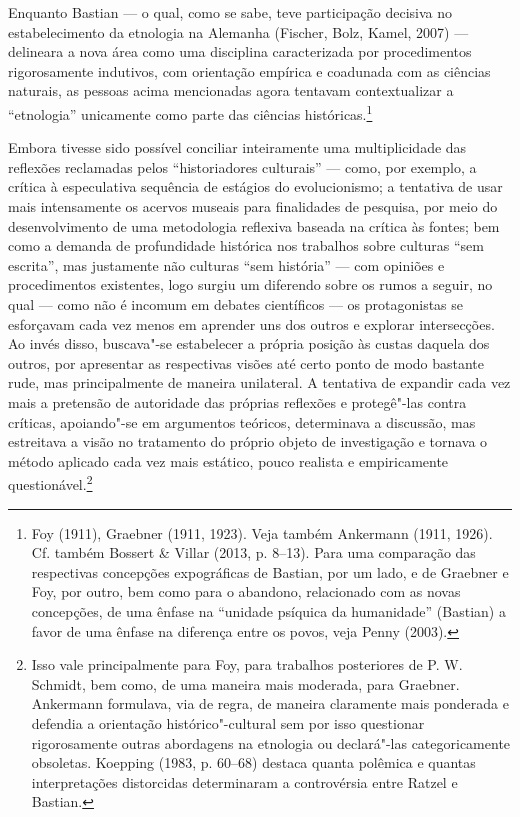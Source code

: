 Enquanto Bastian --- o qual, como se sabe, teve participação decisiva no
estabelecimento da etnologia na Alemanha (Fischer, Bolz, Kamel, 2007) ---
delineara a nova área como uma disciplina caracterizada por
procedimentos rigorosamente indutivos, com orientação empírica e
coadunada com as ciências naturais, as pessoas acima mencionadas agora
tentavam contextualizar a ``etnologia'' unicamente como parte das
ciências históricas.\footnote{Foy (1911), Graebner (1911, 1923). Veja
  também Ankermann (1911, 1926). Cf. também Bossert \& Villar (2013, p.
  8--13). Para uma comparação das respectivas concepções expográficas de
  Bastian, por um lado, e de Graebner e Foy, por outro, bem como para o
  abandono, relacionado com as novas concepções, de uma ênfase na
  ``unidade psíquica da humanidade'' (Bastian) a favor de uma ênfase na
  diferença entre os povos, veja Penny (2003).}

Embora tivesse sido possível conciliar inteiramente uma multiplicidade
das reflexões reclamadas pelos ``historiadores culturais'' --- como, por
exemplo, a crítica à especulativa sequência de estágios do
evolucionismo; a tentativa de usar mais intensamente os acervos museais
para finalidades de pesquisa, por meio do desenvolvimento de uma
metodologia reflexiva baseada na crítica às fontes; bem como a demanda
de profundidade histórica nos trabalhos sobre culturas ``sem escrita'',
mas justamente não culturas ``sem história'' --- com opiniões e
procedimentos existentes, logo surgiu um diferendo sobre os rumos a
seguir, no qual --- como não é incomum em debates científicos --- os
protagonistas se esforçavam cada vez menos em aprender uns dos outros e
explorar intersecções. Ao invés disso, buscava"-se estabelecer a própria
posição às custas daquela dos outros, por apresentar as respectivas
visões até certo ponto de modo bastante rude, mas principalmente de
maneira unilateral. A tentativa de expandir cada vez mais a pretensão
de autoridade das próprias reflexões e protegê"-las contra críticas,
apoiando"-se em argumentos teóricos, determinava a discussão, mas
estreitava a visão no tratamento do próprio objeto de investigação e
tornava o método aplicado cada vez mais estático, pouco realista e
empiricamente questionável.\footnote{Isso vale principalmente para Foy,
  para trabalhos posteriores de P. W. Schmidt, bem como, de uma maneira
  mais moderada, para Graebner. Ankermann formulava, via de regra, de
  maneira claramente mais ponderada e defendia a orientação
  histórico"-cultural sem por isso questionar rigorosamente outras
  abordagens na etnologia ou declará"-las categoricamente obsoletas.
  Koepping (1983, p. 60--68) destaca quanta polêmica e quantas
  interpretações distorcidas determinaram a controvérsia entre Ratzel e
  Bastian.}

